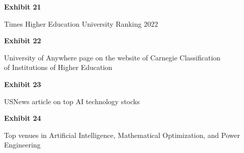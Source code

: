 \documentclass{article}
\begin{document}
% 

\vspace*{\fill}
\begin{center}
{\LARGE \bf
Exhibit 21
}

\vspace{10\baselineskip}

{\large Times Higher Education University Ranking 2022}

\end{center}
\vspace*{\fill}

% 


\vspace*{\fill}
\begin{center}
{\LARGE \bf
Exhibit 22
}

\vspace{10\baselineskip}

{\large University of Anywhere page on the website of Carnegie Classification\\ of Institutions of Higher Education}

\end{center}
\vspace*{\fill}


% 



\vspace*{\fill}
\begin{center}
{\LARGE \bf
Exhibit 23
}

\vspace{10\baselineskip}

{\large USNews article on top AI technology stocks}

\end{center}
\vspace*{\fill}


% 



\vspace*{\fill}
\begin{center}
{\LARGE \bf
Exhibit 24
}

\vspace{10\baselineskip}

{\large Top venues in Artificial Intelligence, Mathematical Optimization, and Power Engineering}

\end{center}
\vspace*{\fill}
\end{document}
